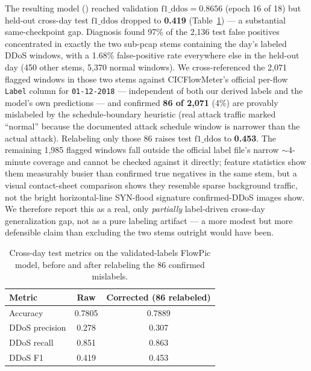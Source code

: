 The resulting model ()
reached validation $\mathrm{f1\_ddos}=0.8656$ (epoch 16 of 18) but
held-out cross-day test $\mathrm{f1\_ddos}$ dropped to \textbf{0.419}
(Table~\ref{tab:gapfix}) --- a substantial same-checkpoint gap. Diagnosis
found 97\% of the 2{,}136 test false positives concentrated in exactly
the two sub-pcap stems containing the day's labeled DDoS windows, with a
1.68\% false-positive rate everywhere else in the held-out day (450
other stems, 5{,}370 normal windows). We cross-referenced the 2{,}071
flagged windows in those two stems against CICFlowMeter's official
per-flow \texttt{Label} column for \texttt{01-12-2018} --- independent of
both our derived labels and the model's own predictions --- and confirmed
\textbf{86 of 2{,}071} (4\%) are provably mislabeled by the
schedule-boundary heuristic (real attack traffic marked ``normal''
because the documented attack schedule window is narrower than the
actual attack). Relabeling only those 86 raises test $\mathrm{f1\_ddos}$
to \textbf{0.453}. The remaining 1{,}985 flagged windows fall outside the
official label file's narrow $\sim$4-minute coverage and cannot be
checked against it directly; feature statistics show them measurably
busier than confirmed true negatives in the same stem, but a visual
contact-sheet comparison shows they resemble sparse background traffic,
not the bright horizontal-line SYN-flood signature confirmed-DDoS images
show. We therefore report this as a real, only \emph{partially}
label-driven cross-day generalization gap, not as a pure labeling
artifact --- a more modest but more defensible claim than excluding the
two stems outright would have been.

\begin{table}[ht]
\centering
\caption[Cross-day test metrics, raw vs.\ corrected]{Cross-day test metrics on the validated-labels FlowPic model, before and after relabeling the 86 confirmed mislabels.}
\begin{tabular}{|l|c|c|}
\hline
\textbf{Metric} & \textbf{Raw} & \textbf{Corrected (86 relabeled)} \\
\hline
Accuracy & 0.7805 & 0.7889 \\
\hline
DDoS precision & 0.278 & 0.307 \\
\hline
DDoS recall & 0.851 & 0.863 \\
\hline
DDoS F1 & 0.419 & 0.453 \\
\hline
\end{tabular}
\label{tab:gapfix}
\end{table}

